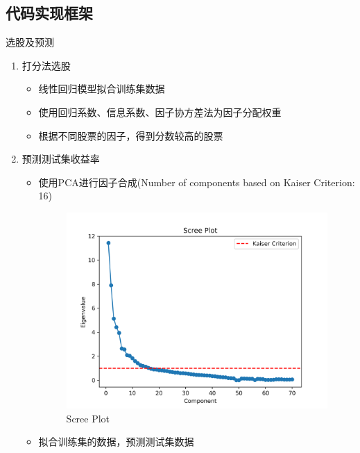 \documentclass[CJK,aspectratio=43]{beamer}  %
\begin{document}
\subsection{代码实现框架}
\begin{frame}{选股及预测}
	\begin{enumerate}
	\item 打分法选股
	\begin{itemize}
		\item 线性回归模型拟合训练集数据
		\item 使用回归系数、信息系数、因子协方差法为因子分配权重
		\item 根据不同股票的因子，得到分数较高的股票
	\end{itemize}
	\item 预测测试集收益率
	\begin{itemize}
		\item 使用PCA进行因子合成(Number of components based on Kaiser Criterion: 16)
		\begin{figure}
			\centering
			\includegraphics[width=0.58\linewidth]{pic/scree_plot}
			\caption{Scree Plot}
			\label{fig:screeplot}
		\end{figure}
		\item 拟合训练集的数据，预测测试集数据
	\end{itemize}
	\end{enumerate}
\end{frame}
\end{document}
